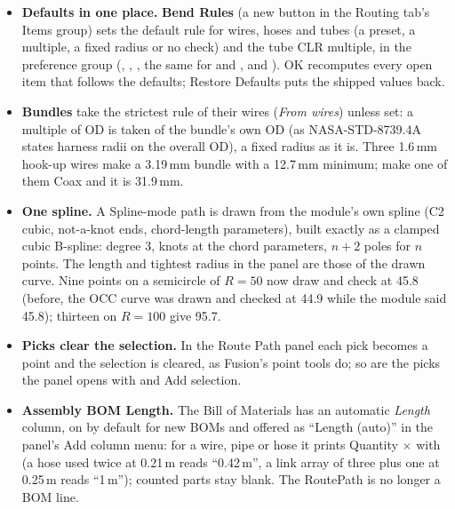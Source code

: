 \begin{itemize}[nosep]
\begin{center}
\begin{tabularx}{\linewidth}{@{}llX@{}}
        \bottomrule
        \end{tabularx}
        \end{center}
  \item \textbf{Defaults in one place.} \textbf{Bend Rules} (a new button in the Routing tab's Items group) sets the
        default rule for wires, hoses and tubes (a preset, a multiple, a fixed radius or no check) and the tube CLR
        multiple, in the preference group  (, ,
        , the same for  and , and ). OK recomputes every
        open item that follows the defaults; Restore Defaults puts the shipped values back.
  \item \textbf{Bundles} take the strictest rule of their wires (\emph{From wires}) unless set: a multiple of OD is
        taken of the bundle's own OD (as NASA-STD-8739.4A states harness radii on the overall OD), a fixed radius as
        it is. Three 1.6\,mm hook-up wires make a 3.19\,mm bundle with a 12.7\,mm minimum; make one of them Coax and
        it is 31.9\,mm.
  \item \textbf{One spline.} A Spline-mode path is drawn from the module's own spline (C2 cubic, not-a-knot ends,
        chord-length parameters), built exactly as a clamped cubic B-spline: degree 3, knots at the chord parameters,
        $n+2$ poles for $n$ points. The length and tightest radius in the panel are those of the drawn curve. Nine
        points on a semicircle of $R=50$ now draw and check at 45.8 (before, the OCC curve was drawn and checked
        at 44.9 while the module said 45.8); thirteen on $R=100$ give 95.7.
  \item \textbf{Picks clear the selection.} In the Route Path panel each pick becomes a point and the selection is
        cleared, as Fusion's point tools do; so are the picks the panel opens with and Add selection.
  \item \textbf{Assembly BOM Length.} The Bill of Materials has an automatic \emph{Length} column, on by default for
        new BOMs and offered as ``Length (auto)'' in the panel's Add column menu: for a wire, pipe or hose it prints
        Quantity $\times$  with  (a hose used twice at 0.21\,m reads
        ``0.42\,m'', a link array of three plus one at 0.25\,m reads ``1\,m''); counted parts stay blank. The
        RoutePath is no longer a BOM line.
\end{itemize}

